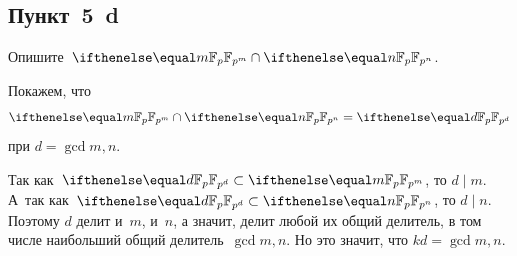 \subsection{Пункт~5~d}

Опишите~$\FFpm \cap \FFpn$.

\begin{solution}
	Покажем, что
	\[
		\FFpm \cap \FFpn = \FFpd
	\]
	при $d = \gcd{m, n}$.

	Так как~$\FFpd \subset \FFpm$, то $d \mid m$. А~так как~$\FFpd \subset \FFpn$, то $d \mid n$. Поэтому $d$ делит и~$m$, и~$n$, а значит, делит любой их общий делитель, в том числе наибольший общий делитель~$\gcd{m, n}$. Но это значит, что $kd = \gcd{m, n}$.
\end{solution}

